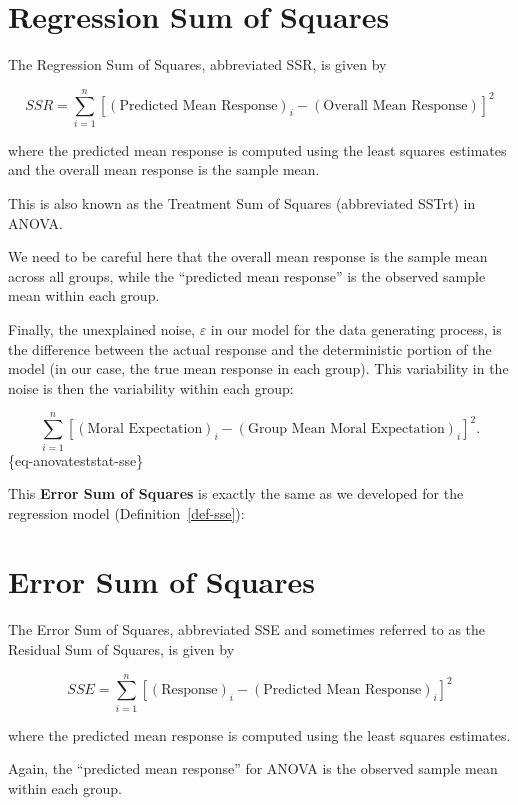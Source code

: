 \documentclass[
  letterpaper,
  DIV=11,
  numbers=noendperiod]{scrreprt}
\theoremstyle{definition}
\theoremstyle{definition}
\theoremstyle{plain}
\theoremstyle{remark}
\begin{document}
\section{Regression Sum of Squares}\label{regression-sum-of-squares-1}

The Regression Sum of Squares, abbreviated SSR, is given by

\[SSR = \sum_{i=1}^{n} \left[(\text{Predicted Mean Response})_i - (\text{Overall Mean Response})\right]^2\]

where the predicted mean response is computed using the least squares
estimates and the overall mean response is the sample mean.

This is also known as the Treatment Sum of Squares (abbreviated SSTrt)
in ANOVA.

We need to be careful here that the overall mean response is the sample
mean across all groups, while the ``predicted mean response'' is the
observed sample mean within each group.

Finally, the unexplained noise, \(\varepsilon\) in our model for the
data generating process, is the difference between the actual response
and the deterministic portion of the model (in our case, the true mean
response in each group). This variability in the noise is then the
variability within each group:

\[\sum_{i=1}^{n} \left[(\text{Moral Expectation})_i - (\text{Group Mean Moral Expectation})_i\right]^2.\]
\{eq-anovateststat-sse\}

This \textbf{Error Sum of Squares} is exactly the same as we developed
for the regression model (Definition~\ref{def-sse}):

\section{Error Sum of Squares}\label{error-sum-of-squares-1}

The Error Sum of Squares, abbreviated SSE and sometimes referred to as
the Residual Sum of Squares, is given by

\[SSE = \sum_{i=1}^{n} \left[(\text{Response})_i - (\text{Predicted Mean Response})_i\right]^2\]

where the predicted mean response is computed using the least squares
estimates.

Again, the ``predicted mean response'' for ANOVA is the observed sample
mean within each group.
\end{document}
